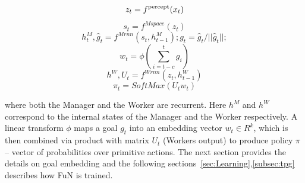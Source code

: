 
\begin{equation}
z_t = f^\textnormal{percept}(x_t)
\end{equation}
\begin{equation}
s_t = f^\textit{Mspace}(z_t)
\end{equation}
\begin{equation}
h^M_t, \hat{g}_t = f^\textit{Mrnn}(s_t, h^M_{t-1}); g_t=\hat{g}_t/||\hat{g}_t||; 
\end{equation}
\begin{equation}
w_t = \phi(\sum_{i=t-c}^t {g_i}) 
\label{eqn:FuN:pool_embed}
\end{equation}
\begin{equation}
h^W, U_t = f^\textit{Wrnn}(z_t, h^W_{t-1}) 
\label{eqn:FuN:psi}
\end{equation}
\begin{equation}
\pi_t = \textit{SoftMax}(U_t w_t)
\label{eqn:FuN:pi}
\end{equation}


where both the Manager and the Worker are recurrent. Here $h^M$ and $h^W$ correspond to the internal states of the Manager and the Worker respectively. A linear transform $\phi$ maps a goal $g_t$ into an embedding vector $w_t \in R^k$, which is then combined via product with matrix $U_t$ (Workers output) to produce policy $\pi$ -- vector of probabilities over primitive actions. 
The next section provides the details on goal embedding and the following sections~\ref{sec:Learning},\ref{subsec:tpg} describes how FuN is trained. 


 

